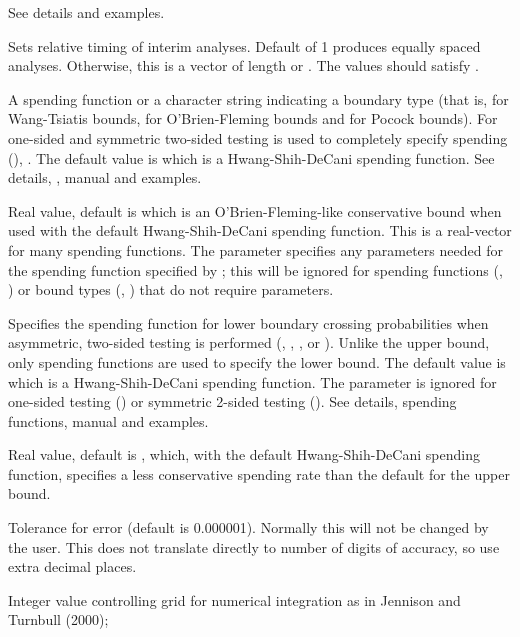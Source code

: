 \begin{Arguments}
\begin{ldescription}
See details and examples.
\item[\code{timing}] Sets relative timing of interim analyses. Default of 1 produces equally spaced analyses. 
Otherwise, this is a vector of length  or .
The values should satisfy .
\item[\code{sfu}] A spending function or a character string indicating a boundary type (that is,  for Wang-Tsiatis bounds,  for O'Brien-Fleming bounds and  for Pocock bounds). 
For one-sided and symmetric two-sided testing is used to completely specify spending (), . 
The default value is  which is a Hwang-Shih-DeCani spending function.
See details, , manual and examples.
\item[\code{sfupar}] Real value, default is  which is an O'Brien-Fleming-like conservative bound when used with the default Hwang-Shih-DeCani spending function. This is a real-vector for many spending functions.
The parameter  specifies any parameters needed for the spending function specified by ; this will be ignored for spending functions (, ) 
or bound types (, ) that do not require parameters.
\item[\code{sfl}] Specifies the spending function for lower boundary crossing probabilities when asymmetric, two-sided testing is performed (, 
, , or ). 
Unlike the upper bound, only spending functions are used to specify the lower bound.
The default value is  which is a Hwang-Shih-DeCani spending function.
The parameter  is ignored for one-sided testing () or symmetric 2-sided testing (). 
See details, spending functions, manual and examples.
\item[\code{sflpar}] Real value, default is , which, with the default Hwang-Shih-DeCani spending function, 
specifies a less conservative spending rate than the default for the upper bound.
\item[\code{tol}] Tolerance for error (default is 0.000001). Normally this will not be changed by the user.
This does not translate directly to number of digits of accuracy, so use extra decimal places.
\item[\code{r}] Integer value controlling grid for numerical integration as in Jennison and Turnbull (2000); 

\end{ldescription}
\end{Arguments}
